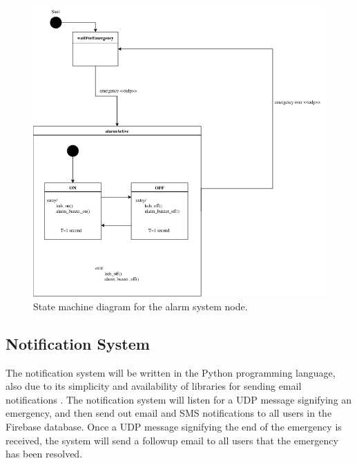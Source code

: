 \begin{figure}[H]
    \centering
    \includegraphics[width=\linewidth]{../assets/AlarmSystemStateMachine.png}
    \caption{State machine diagram for the alarm system node.}
\end{figure}

\subsection{Notification System}

The notification system will be written in the Python programming language, also due to its simplicity and availability
of libraries for sending email notifications \cite{python-email}. The notification system will listen for a UDP message
signifying an emergency, and then send out email and SMS notifications to all users in the Firebase database. Once a
UDP message signifying the end of the emergency is received, the system will send a followup email to all users that
the emergency has been resolved.


